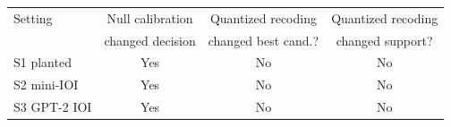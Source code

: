 \begin{tabular}{lccc}
\toprule
Setting & Null calibration & Quantized recoding & Quantized recoding \\
 & changed decision & changed best cand.? & changed support? \\
\midrule
S1 planted & Yes & No & No \\
S2 mini-IOI & Yes & No & No \\
S3 GPT-2 IOI & Yes & No & No \\
\bottomrule
\end{tabular}

